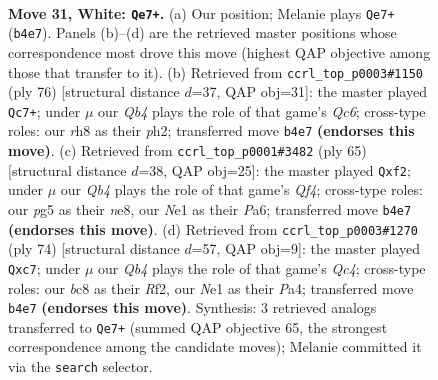 \documentclass[11pt]{article}
\begin{document}
\clearpage

\begin{figure}[p]\centering
\begin{subfigure}{0.46\textwidth}\centering
\resizebox{\linewidth}{!}{%
\newchessgame
\chessboard[
  setfen={n1b4r/1p4k1/8/6p1/1Q5p/P2P1P2/7K/4Nq2 w - - 0 31},
  showmover=false,
  pgfstyle=straightmove, color=movearrow, markmove={b4-e7}
]}
\caption{}
\end{subfigure}\hfill
\begin{subfigure}{0.46\textwidth}\centering
\resizebox{\linewidth}{!}{%
\newchessgame
\chessboard[
  setfen={8/k6p/2Qp4/3Pb3/2P5/1q2P3/2N4p/7K w - - 4 39},
  showmover=false,
  pgfstyle=straightmove, color=movearrow, markmove={c6-c7}
]}
\caption{}
\end{subfigure}
\\[4pt]
\begin{subfigure}{0.46\textwidth}\centering
\resizebox{\linewidth}{!}{%
\newchessgame
\chessboard[
  setfen={4N3/1Q5p/p1n3p1/4pq2/P6k/8/5PPK/8 b - - 0 33},
  showmover=false,
  pgfstyle=straightmove, color=movearrow, markmove={f5-f2}
]}
\caption{}
\end{subfigure}\hfill
\begin{subfigure}{0.46\textwidth}\centering
\resizebox{\linewidth}{!}{%
\newchessgame
\chessboard[
  setfen={4r2k/2p3p1/3p4/7p/P1Q5/q4PP1/5R2/6K1 w - - 1 38},
  showmover=false,
  pgfstyle=straightmove, color=movearrow, markmove={c4-c7}
]}
\caption{}
\end{subfigure}
\caption{\textbf{Move 31, White: \texttt{Qe7+}.} (a) Our position; Melanie plays \texttt{Qe7+} (\texttt{b4e7}). Panels (b)--(d) are the retrieved master positions whose correspondence most drove this move (highest QAP objective among those that transfer to it). (b) Retrieved from \texttt{ccrl\_top\_p0003\#1150} (ply 76) [structural distance $d$=37, QAP obj=31]: the master played \texttt{Qc7+}; under $\mu$ our \emph{Qb4} plays the role of that game's \emph{Qc6}; cross-type roles: our \emph{r}h8 as their \emph{p}h2; transferred move \texttt{b4e7} \textbf{(endorses this move)}. (c) Retrieved from \texttt{ccrl\_top\_p0001\#3482} (ply 65) [structural distance $d$=38, QAP obj=25]: the master played \texttt{Qxf2}; under $\mu$ our \emph{Qb4} plays the role of that game's \emph{Qf4}; cross-type roles: our \emph{p}g5 as their \emph{n}e8, our \emph{N}e1 as their \emph{P}a6; transferred move \texttt{b4e7} \textbf{(endorses this move)}. (d) Retrieved from \texttt{ccrl\_top\_p0003\#1270} (ply 74) [structural distance $d$=57, QAP obj=9]: the master played \texttt{Qxc7}; under $\mu$ our \emph{Qb4} plays the role of that game's \emph{Qc4}; cross-type roles: our \emph{b}c8 as their \emph{R}f2, our \emph{N}e1 as their \emph{P}a4; transferred move \texttt{b4e7} \textbf{(endorses this move)}. Synthesis: 3 retrieved analogs transferred to \texttt{Qe7+} (summed QAP objective 65, the strongest correspondence among the candidate moves); Melanie committed it via the \texttt{search} selector.}
\label{fig:thought-m60}
\end{figure}
\end{document}
